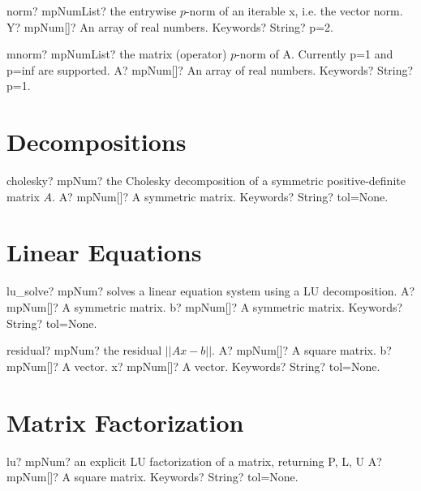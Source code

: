 \documentclass[12pt,a4paper,openany]{book}
\begin{document}
\begin{mpFunctionsExtract}
\mpFunctionTwo
{norm? mpNumList? the entrywise $p$-norm of an iterable x, i.e. the vector norm.}
{Y? mpNum[]? An array of real numbers.}
{Keywords? String?  p=2.}
\end{mpFunctionsExtract}

\begin{mpFunctionsExtract}
\mpFunctionTwo
{mnorm? mpNumList? the matrix (operator) $p$-norm of A. Currently p=1 and p=inf are supported.}
{A? mpNum[]? An array of real numbers.}
{Keywords? String?  p=1.}
\end{mpFunctionsExtract}

\section{Decompositions}

\begin{mpFunctionsExtract}
\mpFunctionTwo
{cholesky? mpNum? the Cholesky decomposition of a symmetric positive-definite matrix $A$.}
{A? mpNum[]? A symmetric matrix.}
{Keywords? String?  tol=None.}
\end{mpFunctionsExtract}

\section{Linear Equations}

\begin{mpFunctionsExtract}
\mpFunctionThree
{lu\_solve? mpNum? solves a linear equation system using a LU decomposition.}
{A? mpNum[]? A symmetric matrix.}
{b? mpNum[]? A symmetric matrix.}
{Keywords? String?  tol=None.}
\end{mpFunctionsExtract}

\begin{mpFunctionsExtract}
\mpFunctionFour
{residual? mpNum? the residual  $||Ax-b||$.}
{A? mpNum[]? A square matrix.}
{b? mpNum[]? A vector.}
{x? mpNum[]? A vector.}
{Keywords? String?  tol=None.}
\end{mpFunctionsExtract}

\section{Matrix Factorization}

\begin{mpFunctionsExtract}
\mpFunctionTwo
{lu? mpNum? an explicit LU factorization of a matrix, returning P, L, U}
{A? mpNum[]? A square matrix.}
{Keywords? String?  tol=None.}
\end{mpFunctionsExtract}
\end{document}
